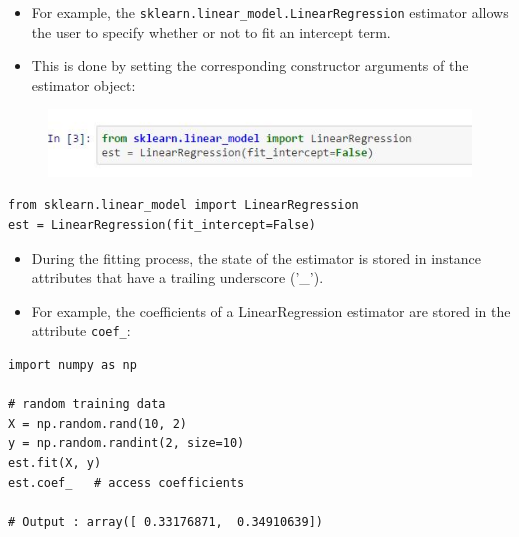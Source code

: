 \documentclass[MASTER.tex]{subfiles}
\begin{document}
\begin{frame}[fragile]
	\Large
	\begin{itemize}
		\item For example, the \texttt{sklearn.linear\_model.LinearRegression} estimator allows the user to specify whether or not to fit an intercept term. 
\item This is done by setting the corresponding constructor arguments of the estimator object:
\end{itemize}
\end{frame}
\begin{frame}[fragile]
	\begin{figure}
\centering
\includegraphics[width=1.1\linewidth]{sklcass/sklclass1a}

\end{figure}

\large
\begin{framed}
\begin{verbatim}
from sklearn.linear_model import LinearRegression
est = LinearRegression(fit_intercept=False)
\end{verbatim}
\end{framed}

\end{frame}
\begin{frame}[fragile]
\Large
\begin{itemize}
\item During the fitting process, the state of the estimator is stored in instance attributes that have a trailing underscore ('\_'). 
\item For example, the coefficients of a LinearRegression estimator are stored in the attribute \texttt{coef\_}:
\end{itemize}

\end{frame}
\begin{frame}[fragile]
\begin{framed}
\begin{verbatim}
import numpy as np

# random training data
X = np.random.rand(10, 2)
y = np.random.randint(2, size=10)
est.fit(X, y)
est.coef_   # access coefficients

# Output : array([ 0.33176871,  0.34910639])
\end{verbatim}
\end{framed}
\end{frame}
\end{document}
